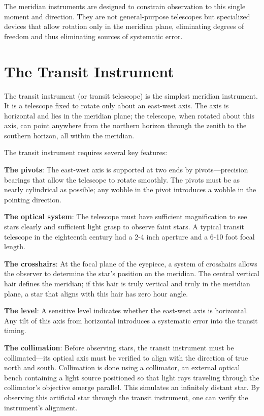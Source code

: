The meridian instruments are designed to constrain observation to this single moment and direction. They are not general-purpose telescopes but specialized devices that allow rotation only in the meridian plane, eliminating degrees of freedom and thus eliminating sources of systematic error.

\section{The Transit Instrument}

The transit instrument (or transit telescope) is the simplest meridian instrument. It is a telescope fixed to rotate only about an east-west axis. The axis is horizontal and lies in the meridian plane; the telescope, when rotated about this axis, can point anywhere from the northern horizon through the zenith to the southern horizon, all within the meridian.

The transit instrument requires several key features:

\textbf{The pivots}: The east-west axis is supported at two ends by pivots—precision bearings that allow the telescope to rotate smoothly. The pivots must be as nearly cylindrical as possible; any wobble in the pivot introduces a wobble in the pointing direction.

\textbf{The optical system}: The telescope must have sufficient magnification to see stars clearly and sufficient light grasp to observe faint stars. A typical transit telescope in the eighteenth century had a 2-4 inch aperture and a 6-10 foot focal length.

\textbf{The crosshairs}: At the focal plane of the eyepiece, a system of crosshairs allows the observer to determine the star's position on the meridian. The central vertical hair defines the meridian; if this hair is truly vertical and truly in the meridian plane, a star that aligns with this hair has zero hour angle.

\textbf{The level}: A sensitive level indicates whether the east-west axis is horizontal. Any tilt of this axis from horizontal introduces a systematic error into the transit timing.

\textbf{The collimation}: Before observing stars, the transit instrument must be collimated—its optical axis must be verified to align with the direction of true north and south. Collimation is done using a collimator, an external optical bench containing a light source positioned so that light rays traveling through the collimator's objective emerge parallel. This simulates an infinitely distant star. By observing this artificial star through the transit instrument, one can verify the instrument's alignment.

